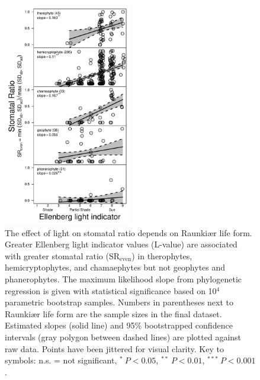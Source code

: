 \documentclass[12pt, oneside]{article}
\newcommand{\el}{L-value}
\begin{document}
\begin{figure}[ht]
\centerline{\includegraphics[width=0.5\textwidth]{figures/figure_SR-lf.pdf}}
\caption{The effect of light on stomatal ratio depends on Raunki\ae r life form. Greater Ellenberg light indicator values (\el) are associated with greater stomatal ratio ($\mathrm{SR_{even}}$) in therophytes, hemicryptophytes, and chamaephytes but not geophytes and phanerophytes. The maximum likelihood slope from phylogenetic regression is given with statistical significance based on 10$^4$ parametric bootstrap samples. Numbers in parentheses next to Raunki\ae r life form are the sample sizes in the final dataset. Estimated slopes (solid line) and 95\% bootstrapped confidence intervals (gray polygon between dashed lines) are plotted against raw data. Points have been jittered for visual clarity. Key to symbols: n.s. = not significant,  $^*~P < 0.05$, $^{**}~P < 0.01$, $^{***}~P < 0.001$.} 
\label{fig:SR-lf}
\end{figure}
\end{document}
